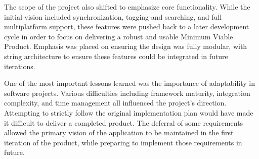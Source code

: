 The scope of the project also shifted to emphasize core functionality. While the initial vision included synchronization, tagging and searching, and full multiplatform support, these features were pushed back to a later development cycle in order to focus on delivering a robust and usable Minimum Viable Product. Emphasis was placed on ensuring the design was fully modular, with string architecture to ensure these features could be integrated in future iterations. 

One of the most important lessons learned was the importance of adaptability in software projects. Various difficulties including framework maturity, integration complexity, and time management all influenced the project's direction. Attempting to strictly follow the original implementation plan would have made it difficult to deliver a completed product. The deferral of some requirements allowed the primary vision of the application to be maintained in the first iteration of the product, while preparing to implement those requirements in future. 




